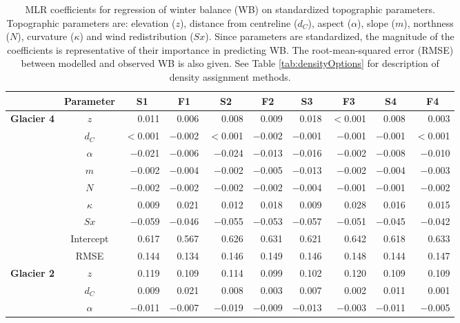 \documentclass{sfuthesis}
\newcommand{\params}{Topographic parameters are: elevation ($z$), distance from centreline ($d_C$), aspect ($\alpha$), slope ($m$), northness ($N$), curvature ($\kappa$) and wind redistribution ($Sx$). }
\begin{document}
{\begin{table}
\footnotesize
\centering
\caption[MLR coefficients for regression of winter balance (WB) on standardized topographic parameters]{MLR coefficients for regression of winter balance (WB) on standardized topographic parameters. \params  Since parameters are standardized, the magnitude of the coefficients is representative of their importance in predicting WB. The root-mean-squared error (RMSE) between modelled and observed WB is also given. See Table \ref{tab:densityOptions} for description of density assignment methods.}
\label{tab:MLRcoeffFull}
\begin{tabular}{ccrrrrrrrr}
 & \textbf{Parameter} & \multicolumn{1}{c}{\textbf{S1}} & \multicolumn{1}{c}{\textbf{F1}} & \multicolumn{1}{c}{\textbf{S2}} & \multicolumn{1}{c}{\textbf{F2}} & \multicolumn{1}{c}{\textbf{S3}} & \multicolumn{1}{c}{\textbf{F3}} & \multicolumn{1}{c}{\textbf{S4}} & \multicolumn{1}{c}{\textbf{F4}} \\ \hline \hline
\multirow{9}{*}{\textbf{Glacier 4}} & $z$ & 0.011 & 0.006 & 0.008 & 0.009 & 0.018 & $<$0.001 & 0.008 & 0.003 \\
 & $d_C$ & $<$0.001 & $-$0.002 & $<$0.001 & $-$0.002 & $-$0.001 & $-$0.001 & $-$0.001 & $<$0.001 \\
 & $\alpha$ & $-$0.021 & $-$0.006 & $-$0.024 & $-$0.013 & $-$0.016 & $-$0.002 & $-$0.008 & $-$0.010 \\
 & $m$ & $-$0.002 & $-$0.004 & $-$0.002 & $-$0.005 & $-$0.013 & $-$0.002 & $-$0.004 & $-$0.003 \\
 & $N$ & $-$0.002 & $-$0.002 & $-$0.002 & $-$0.002 & $-$0.004 & $-$0.001 & $-$0.001 & $-$0.002 \\
 & $\kappa$ & 0.009 & 0.021 & 0.012 & 0.018 & 0.009 & 0.028 & 0.016 & 0.015 \\
 & $Sx$ & $-$0.059 & $-$0.046 & $-$0.055 & $-$0.053 & $-$0.057 & $-$0.051 & $-$0.045 & $-$0.042 \\
 & Intercept & 0.617 & 0.567 & 0.626 & 0.631 & 0.621 & 0.642 & 0.618 & 0.633 \\
 & RMSE & 0.144 & 0.134 & 0.146 & 0.149 & 0.146 & 0.148 & 0.144 & 0.147 \\ \hline
\multirow{9}{*}{\textbf{Glacier 2}} & $z$ & 0.119 & 0.109 & 0.114 & 0.099 & 0.102 & 0.120 & 0.109 & 0.109 \\
 & $d_C$ & 0.009 & 0.021 & 0.008 & 0.003 & 0.007 & 0.002 & 0.011 & 0.001 \\
 & $\alpha$ & $-$0.011 & $-$0.007 & $-$0.019 & $-$0.009 & $-$0.013 & $-$0.003 & $-$0.011 & $-$0.005 \\

\end{tabular}
\end{table}}
\end{document}
